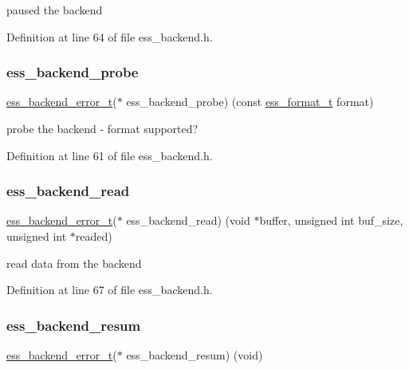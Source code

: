 paused the backend 

Definition at line 64 of file ess\+\_\+backend.\+h.

\mbox{\label{structess__backend_aae4f1015dadb3ed79975c5b7b78e547f}} 
\subsubsection{\texorpdfstring{ess\+\_\+backend\+\_\+probe}{ess\_backend\_probe}}
{\footnotesize\ttfamily \hyperlink{ess__backend_8h_aa3de0496a3f361a6b38684e9cb65f01c}{ess\+\_\+backend\+\_\+error\+\_\+t}($\ast$  ess\+\_\+backend\+\_\+probe) (const \hyperlink{ess__format_8h_ab03f24cb5d42f4448f713bf1ec178163}{ess\+\_\+format\+\_\+t} format)}

probe the backend -\/ format supported? 

Definition at line 61 of file ess\+\_\+backend.\+h.

\mbox{\label{structess__backend_ae79b75bd5bc3c4fd9c3b3706eed97bfb}} 
\subsubsection{\texorpdfstring{ess\+\_\+backend\+\_\+read}{ess\_backend\_read}}
{\footnotesize\ttfamily \hyperlink{ess__backend_8h_aa3de0496a3f361a6b38684e9cb65f01c}{ess\+\_\+backend\+\_\+error\+\_\+t}($\ast$  ess\+\_\+backend\+\_\+read) (void $\ast$buffer, unsigned int buf\+\_\+size, unsigned int $\ast$readed)}

read data from the backend 

Definition at line 67 of file ess\+\_\+backend.\+h.

\mbox{\label{structess__backend_ab9a30f8d9f4bd941ae74e3ef0c9d7aa3}} 
\subsubsection{\texorpdfstring{ess\+\_\+backend\+\_\+resum}{ess\_backend\_resum}}
{\footnotesize\ttfamily \hyperlink{ess__backend_8h_aa3de0496a3f361a6b38684e9cb65f01c}{ess\+\_\+backend\+\_\+error\+\_\+t}($\ast$  ess\+\_\+backend\+\_\+resum) (void)}

